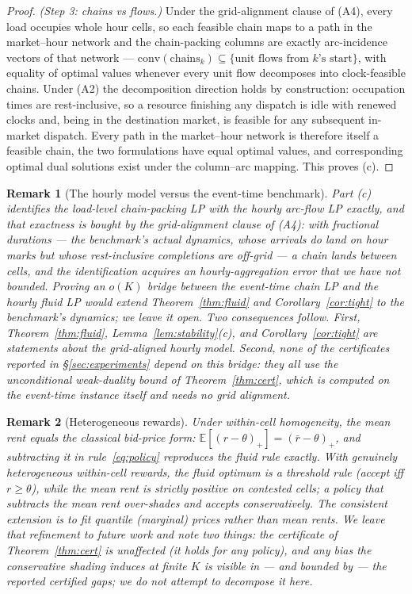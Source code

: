 \documentclass[11pt]{article}
\newtheorem{remark}{Remark}
\begin{document}
\begin{proof}
\emph{(Step 3: chains vs flows.)} Under the grid-alignment clause of
(A4), every load occupies whole hour cells, so each feasible chain
maps to a path in the market--hour network and the chain-packing
columns are exactly arc-incidence vectors of that network ---
$\mathrm{conv}(\text{chains}_k) \subseteq \{\text{unit flows from } k
\text{'s start}\}$, with equality of optimal values whenever every
unit flow decomposes into clock-feasible chains. Under (A2) the
decomposition direction holds by construction: occupation times are
rest-inclusive, so a resource finishing any dispatch is idle with
renewed clocks and, being in the destination market, is feasible for
any subsequent in-market dispatch. Every path in the market--hour
network is therefore itself a feasible chain, the two formulations
have equal optimal values, and corresponding optimal dual solutions
exist under the column--arc mapping. This proves (c).
\end{proof}

\begin{remark}[The hourly model versus the event-time benchmark]
\label{rem:gridgap}
Part (c) identifies the load-level chain-packing LP with the hourly
arc-flow LP \emph{exactly}, and that exactness is bought by the
grid-alignment clause of (A4): with fractional durations --- the
benchmark's actual dynamics, whose arrivals do land on hour marks but
whose rest-inclusive completions are off-grid --- a chain lands
between cells, and the identification
acquires an hourly-aggregation error that we have not bounded.
Proving an $o(K)$ bridge between the event-time chain LP and the
hourly fluid LP would extend Theorem~\ref{thm:fluid} and
Corollary~\ref{cor:tight} to the benchmark's dynamics; we leave it
open. Two consequences follow. First, Theorem~\ref{thm:fluid},
Lemma~\ref{lem:stability}(c), and Corollary~\ref{cor:tight} are
statements about the grid-aligned hourly model. Second, none of the
certificates reported in \S\ref{sec:experiments} depend on this
bridge: they all use the unconditional weak-duality bound of
Theorem~\ref{thm:cert}, which is computed on the event-time instance
itself and needs no grid alignment.
\end{remark}

\begin{remark}[Heterogeneous rewards]
\label{rem:heterogeneous}
Under within-cell homogeneity, the mean rent equals the classical
bid-price form: $\mathbb{E}[(r - \theta)_+] = (\bar{r} - \theta)_+$,
and subtracting it in rule~\eqref{eq:policy} reproduces the fluid rule
exactly. With genuinely heterogeneous within-cell rewards, the fluid
optimum is a \emph{threshold} rule (accept iff $r \geq \theta$),
while the mean rent is strictly positive on contested cells; a policy
that subtracts the mean rent over-shades and accepts conservatively.
The consistent extension is to fit quantile (marginal) prices rather
than mean rents. We leave that refinement to future work and note two
things: the certificate of Theorem~\ref{thm:cert} is unaffected
(it holds for any policy), and any bias the conservative shading
induces at finite $K$ is visible in --- and bounded by --- the reported
certified gaps; we do not attempt to decompose it here.
\end{remark}
\end{document}
